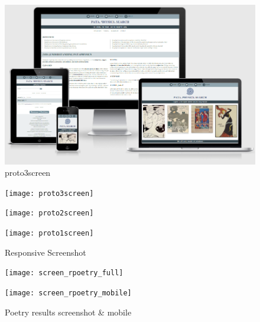 \begin{figure}[htb] %
  \centering
  \includegraphics[width=\linewidth]{images/proto3screen}
\caption[proto3screen]{proto3screen}
\label{img:proto3screen}
\end{figure}

\begin{figure}[htb]
  \centering
  \begin{minipage}{\linewidth}
    \texttt{[image: proto3screen]}
  \end{minipage}
  \hspace{.05\linewidth}
  \begin{minipage}{\linewidth}
    \texttt{[image: proto2screen]}
  \end{minipage}
  \hspace{.05\linewidth}
  \begin{minipage}{\linewidth}
    \texttt{[image: proto1screen]}
  \end{minipage}
  \caption[responsive screenshots]{Responsive Screenshot}
\label{Respscreenshots}
\end{figure}

\begin{figure}[htb]
  \centering
  \begin{minipage}{.57\linewidth}
    \texttt{[image: screen\_rpoetry\_full]}
  \end{minipage}
  \hspace{.05\linewidth}
  \begin{minipage}{.27\linewidth}
    \texttt{[image: screen\_rpoetry\_mobile]}
  \end{minipage}
  \caption[screenshots]{Poetry results screenshot \& mobile}
\label{screenshots}
\end{figure}

